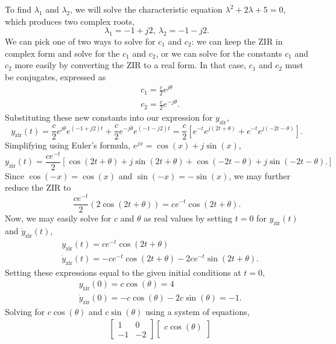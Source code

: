 \documentclass{article}
\begin{document}
\begin{enumerate}[label=\thesubsubsection]
\begin{enumerate}[label=(\alph*), start=2]
		To find \(\lambda_1\) and \(\lambda_2\), we will solve the characteristic equation \(\lambda^2 + 2\lambda + 5=0 \), which produces two complex roots, 
		\[
			\lambda_1 = -1+j2, \ \lambda_2 = -1-j2.
		\]
		We can pick one of two ways to solve for \(c_1\) and \(c_2\): we can keep the ZIR in complex form and solve for the \(c_1\) and \(c_2\), or we can solve for the constants \(c_1\) and \(c_2\) more easily by converting the ZIR to a real form. In that case, \(c_1\) and \(c_2\) must be conjugates, expressed as 
		\begin{align*}
			& c_1 = \frac{c}{2}e^{j\theta} \\
			& c_2 = \frac{c}{2}e^{-j\theta}.
		\end{align*}
		Substituting these new constants into our expression for \(y_{\mathrm{zir}}\), 
		\[
			y_{\mathrm{zir}}(t) = \frac{c}{2}e^{j\theta}e^{(-1+j2)t} + \frac{c}{2}e^{-j\theta}e^{(-1-j2)t} = \frac{c}{2}[e^{-t}e^{j(2t+\theta)} + e^{-t}e^{j(-2t-\theta)}]. 
		\]
		Simplifying using Euler's formula, \(e^{jx} = \cos{(x)} + j\sin{(x)}\),
		\[
			y_{\mathrm{zir}}(t) = \frac{ce^{-t}}{2}[\cos{(2t+\theta)} + j\sin{(2t+\theta)} + \cos{(-2t-\theta)} + j\sin{(-2t-\theta)}.]
		\]
		Since \(\cos{(-x)} = \cos{(x)}\) and \(\sin{(-x)} = -\sin{(x)}\), we may further reduce the ZIR to 
		\[
		\frac{ce^{-t}}{2}(2\cos{(2t+\theta)}) = ce^{-t}\cos{(2t+\theta)}.
		\]
		Now, we may easily solve for \(c\) and \(\theta\) as real values by setting \(t=0\) for \(y_{\mathrm{zir}}(t)\) and \(\dot{y}_{\mathrm{zir}}(t)\), 
		\begin{align*}
		 & y_{\mathrm{zir}}(t) = ce^{-t}\cos{(2t+\theta)} \\
		 & \dot{y}_{\mathrm{zir}}(t) = -ce^{-t}\cos{(2t+\theta)} - 2ce^{-t}\sin{(2t+\theta)}.
		\end{align*}
		Setting these expressions equal to the given initial conditions at \(t=0\), 
		\begin{align*}
			&y_{\mathrm{zir}}(0) = c\cos{(\theta)} = 4 \\ 
			&\dot{y}_{\mathrm{zir}}(0) = -c\cos{(\theta)} - 2c\sin{(\theta)} = -1.
		\end{align*}
		Solving for \(c\cos{(\theta)}\) and \(c\sin{(\theta)}\) using a system of equations,  
		\begin{align*}
			&\begin{bmatrix}
				1 & 0 \\
        -1	& -2
			\end{bmatrix}
			\begin{bmatrix}
				c\cos{(\theta)} \\

\end{bmatrix}
\end{align*}
\end{enumerate}
\end{enumerate}
\end{document}
